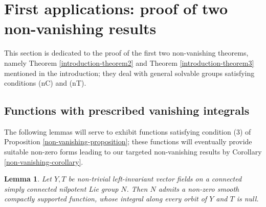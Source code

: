 \documentclass[JEP,XML,SOM,Unicode,published]{cedram}
\theoremstyle{plain}
\newtheorem{lemma}[equation]{Lemma}
\theoremstyle{remark}
\theoremstyle{definition}
\begin{document}
\section{First applications: proof of two non-vanishing results}
\label{s - proof of non-vanishings}

This section is dedicated to the proof of the first two non-vanishing theorems, namely Theorem \ref{introduction-theorem2} and Theorem \ref{introduction-theorem3} mentioned in the introduction; they deal with general solvable groups satisfying conditions (nC) and (nT).

\subsection{Functions with prescribed vanishing integrals}
\label{ss - suitable functions}
The following lemmas will serve to exhibit functions satisfying condition (3) of Proposition \ref{non-vanishing-proposition}; these functions will eventually provide suitable non-zero forms leading to our targeted non-vanishing results by Corollary \ref{non-vanishing-corollary}.

\begin{lemma}\label{criterium-lemma2}
Let $Y, T$ be non-trivial left-invariant vector fields on a connected simply connected nilpotent Lie group $N$.
Then $N$ admits a non-zero smooth compactly supported function, whose integral along every orbit of $Y$ and $T$ is null.
\end{lemma}
\end{document}
